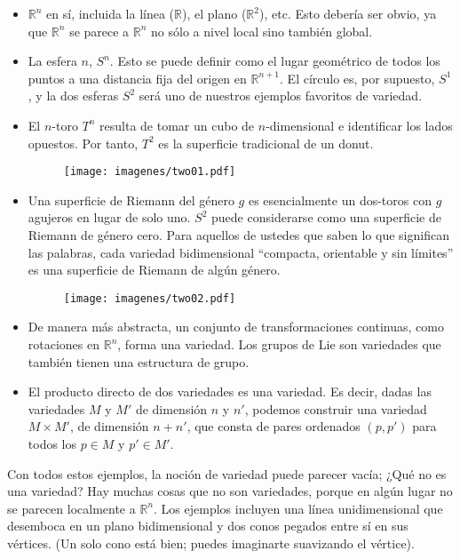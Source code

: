 \documentclass[11pt,b5paper,openany,twoside]{book}
\begin{document}
\begin{itemize}
\item $\mathbb{R}^n$ en sí, incluida la línea ($\mathbb{R}$), el plano ($\mathbb{R}^2$), etc.
Esto debería ser obvio, ya que $\mathbb{R}^n$ se parece a $\mathbb{R}^n$ no sólo a nivel local sino también global.
\item La esfera $n$, $S^n$.
Esto se puede definir como el lugar geométrico de todos los puntos a una distancia fija del origen en $\mathbb{R}^{n+1}$.
El círculo es, por supuesto, $S^1$, y la dos esferas $S^2$ será uno de nuestros ejemplos favoritos de variedad.

\item El $n$-toro $T^n$ resulta de tomar un cubo de $n$-dimensional e identificar los lados opuestos.
Por tanto, $T^2$ es la superficie tradicional de un donut.

\begin{figure}[h]
\centering
\texttt{[image: imagenes/two01.pdf]}
\end{figure}

\item Una superficie de Riemann del género $g$ es esencialmente un dos-toros con $g$ agujeros en lugar de solo uno.
$S^2$ puede considerarse como una superficie de Riemann de género cero.
Para aquellos de ustedes que saben lo que significan las palabras, cada variedad bidimensional ``compacta, orientable y sin límites'' es una superficie de Riemann de algún género.

\begin{figure}[h]
\centering
\texttt{[image: imagenes/two02.pdf]}
\end{figure}

\item De manera más abstracta, un conjunto de transformaciones continuas, como rotaciones en $\mathbb{R}^n$, forma una variedad.
Los grupos de Lie son variedades que también tienen una estructura de grupo.

\item El producto directo de dos variedades es una variedad.
Es decir, dadas las variedades $M$ y $M'$ de dimensión $n$ y $n'$, podemos construir una variedad $M\times M'$, de dimensión $n+n'$, que consta de pares ordenados $(p,p')$ para todos los $p\in M$ y $p'\in M'$.

\end{itemize}

Con todos estos ejemplos, la noción de variedad puede parecer vacía; ¿Qué no es una variedad? Hay muchas cosas que no son variedades, porque en algún lugar no se parecen localmente a $\mathbb{R}^n$.
Los ejemplos incluyen una línea unidimensional que desemboca en un plano bidimensional y dos conos pegados entre sí en sus vértices.
(Un solo cono está bien; puedes imaginarte suavizando el vértice).
\end{document}
